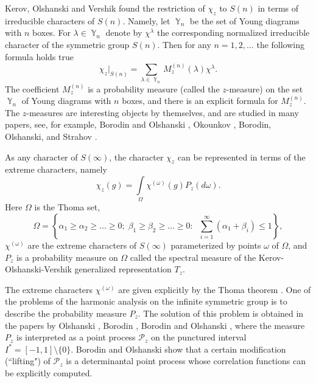\documentclass[12pt]{amsart}
\theoremstyle{definition}
\numberwithin{equation}{section}
\DeclareMathOperator{\Y}{\mathbb{Y}}
\begin{document}
 Kerov, Olshanski and Vershik
\cite{KerovOlshanskiVershik, KerovOlshanskiVershikAnnouncement} found the restriction of $\chi_z$ to $S(n)$ in terms of irreducible characters of $S(n)$. Namely, let $\Y_n$ be the set of Young diagrams with $n$ boxes. For $\lambda\in\Y_n$ denote by $\chi^{\lambda}$ the corresponding normalized irreducible character
of the symmetric group $S(n)$. Then for any $n=1,2,\ldots $ the following formula holds true
\begin{equation}
\chi_z|_{S(n)}=\sum\limits_{\lambda\in\Y_n}M_z^{(n)}(\lambda)\chi^{\lambda}.
\nonumber
\end{equation}
The coefficient $M_z^{(n)}$ is a probability measure (called the $z$-measure) on the set $\Y_n$ of Young diagrams with $n$ boxes, and there is an explicit formula for $M_{z}^{(n)}$. The $z$-measures
are interesting objects by themselves, and are studied in many papers, see, for example,
Borodin and Olshanski \cite{BorodinOlshanskiRSK, BorodinOlshanskiKernel}, Okounkov \cite{Okounkov},
Borodin, Olshanski, and Strahov \cite{BorodinOlshanskiStrahov}.
















As any character of $S(\infty)$, the character $\chi_z$ can be represented
in terms of the extreme characters, namely
\begin{equation}
\chi_z\left(g\right)=\int\limits_{\Omega}\chi^{(\omega)}(g)P_{z}(d\omega).
\nonumber
\end{equation}
Here $\Omega$ is the Thoma set,
\begin{equation}\label{ThomaSet}
\Omega=\left\{\alpha_1\geq\alpha_2\geq\ldots\geq 0;\;\beta_1\geq\beta_2\geq\ldots\geq 0:\;\;
\sum\limits_{i=1}^{\infty}\left(\alpha_1+\beta_i\right)\leq 1\right\},
\nonumber
\end{equation}
$\chi^{(\omega)}$ are the extreme characters of  $S(\infty)$
parameterized by points $\omega$ of $\Omega$, and $P_{z}$ is a probability measure on $\Omega$  called the spectral measure of the Kerov-Olshanski-Vershik generalized representation $T_z$.

The extreme characters $\chi^{(\omega)}$ are given explicitly by the Thoma theorem \cite{Thoma}. One of the problems of the harmonic analysis on the infinite symmetric group is to describe the probability measure $P_{z}$. The solution of this problem is obtained in the papers by Olshanski \cite{OlshanskiPointProcesses}, Borodin \cite{Borodin1, Borodin2}, Borodin and Olshanski \cite{BorodinOlshanskiLetters}, where the measure $P_{z}$ is interpreted as a point process
$\mathcal{P}_{z}$ on the punctured interval $I^{\ast}=[-1,1]\setminus\{0\}$.
Borodin and Olshanski  show that a certain modification (``lifting") of
$\mathcal{P}_{z}$ is a determinantal point process whose correlation functions can be explicitly computed.
\end{document}
